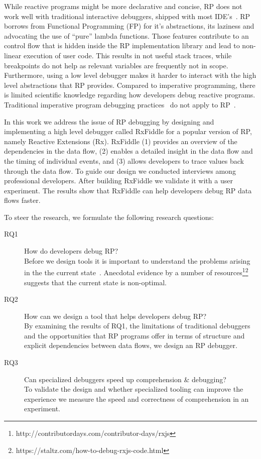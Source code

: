 While reactive programs might be more declarative and concise, RP does not work well with traditional interactive debuggers, shipped with most IDE's~\cite{salvaneschi2016debugging}. RP borrows from Functional Programming (FP) for it's abstractions, its laziness and advocating the use of ``pure'' lambda functions. Those features contribute to an control flow that is hidden inside the RP implementation library and lead to non-linear execution of user code. This results in not useful stack traces, while breakpoints do not help as relevant variables are frequently not in scope. Furthermore, using a low level debugger makes it harder to interact with the high level abstractions that RP provides.
Compared to imperative programming, there is limited scientific knowledge regarding how developers debug reactive programs. Traditional imperative program debugging practices~\cite{beller2017behavior} do not apply to RP~\cite{salvaneschi2016debugging}.

In this work we address the issue of RP debugging by designing and implementing a high level debugger called RxFiddle for a popular version of RP, namely Reactive Extensions (Rx). RxFiddle  (1) provides an overview of the dependencies in the data flow, (2) enables a detailed insight in the data flow and the timing of individual events, and (3) allows developers to trace values back through the data flow. To guide our design we conducted interviews among professional developers. After building RxFiddle we validate it with a user experiment. The results show that RxFiddle can help developers debug RP data flows faster.

To steer the research, we formulate the following research questions:

\begin{description}
\item[RQ1] How do developers debug RP? \\
Before we design tools it is important to understand the problems arising in the the current state~\cite{singer2010examination}. Anecdotal evidence by a number of resources\footnote{\label{foot:contribdays}http://contributordays.com/contributor-days/rxjs}\footnote{https://staltz.com/how-to-debug-rxjs-code.html}
suggests that the current state is non-optimal.

\item[RQ2] How can we design a tool that helps developers debug RP? \\
By examining the results of RQ1, the limitations of traditional debuggers and the opportunities that RP programs offer in terms of structure and explicit dependencies between data flows, we design an RP debugger.

\item[RQ3] Can specialized debuggers speed up comprehension \& debugging? \\
To validate the design and whether specialized tooling can improve the experience we measure the speed and correctness of comprehension in an experiment.

\end{description}

